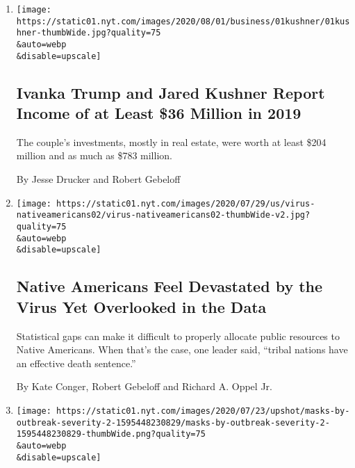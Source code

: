 \begin{enumerate}
\def\labelenumi{\arabic{enumi}.}
\item
  \href{/2020/08/01/business/ivanka-trump-jared-kushner-financial-disclosure.html}{}

  \texttt{[image: https://static01.nyt.com/images/2020/08/01/business/01kushner/01kushner-thumbWide.jpg?quality=75\\\&auto=webp\\\&disable=upscale]}

  \hypertarget{ivanka-trump-and-jared-kushner-report-income-of-at-least-36-million-in-2019}{%
  \subsection{Ivanka Trump and Jared Kushner Report Income of at Least
  \$36 Million in
  2019}\label{ivanka-trump-and-jared-kushner-report-income-of-at-least-36-million-in-2019}}

  The couple's investments, mostly in real estate, were worth at least
  \$204 million and as much as \$783 million.

  By Jesse Drucker and Robert Gebeloff
\item
  \href{/2020/07/30/us/native-americans-coronavirus-data.html}{}

  \texttt{[image: https://static01.nyt.com/images/2020/07/29/us/virus-nativeamericans02/virus-nativeamericans02-thumbWide-v2.jpg?quality=75\\\&auto=webp\\\&disable=upscale]}

  \hypertarget{native-americans-feel-devastated-by-the-virus-yet-overlooked-in-the-data}{%
  \subsection{Native Americans Feel Devastated by the Virus Yet
  Overlooked in the
  Data}\label{native-americans-feel-devastated-by-the-virus-yet-overlooked-in-the-data}}

  Statistical gaps can make it difficult to properly allocate public
  resources to Native Americans. When that's the case, one leader said,
  ``tribal nations have an effective death sentence.''

  By Kate Conger, Robert Gebeloff and Richard A. Oppel Jr.
\item
  \href{/2020/07/30/upshot/coronavirus-republican-voting.html}{}

  \texttt{[image: https://static01.nyt.com/images/2020/07/23/upshot/masks-by-outbreak-severity-2-1595448230829/masks-by-outbreak-severity-2-1595448230829-thumbWide.png?quality=75\\\&auto=webp\\\&disable=upscale]}


\end{enumerate}
